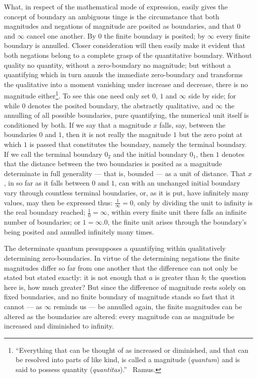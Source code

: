 \documentclass[12pt,a4paper]{book}
\begin{document}
What, in respect of the mathematical mode of expression, easily gives the
concept of boundary an ambiguous tinge is the circumstance that both magnitudes
and negations of magnitude are posited as boundaries, and that $0$ and $\infty$
\setcounter{footnote}{0}
cancel one another. By $0$ the finite boundary is posited; by $\infty$ every
finite boundary is annulled. Closer consideration will then easily make it
evident that both negations belong to a complete grasp of the quantitative
boundary. Without quality no quantity, without a zero-boundary no magnitude;
but without a quantifying which in turn annuls the immediate zero-boundary and
transforms the qualitative into a moment vanishing under increase and decrease,
there is no magnitude either\footnote{``Everything that can be thought of as
increased or diminished, and that can be resolved into parts of like kind, is
called a magnitude (\textit{quantum}) and is said to possess quantity
(\textit{quantitas}).'' \ Ramus.}. To see this one need only set $0$, $1$ and
$\infty$ side by side; for while $0$ denotes the posited boundary, the
abstractly qualitative, and $\infty$ the annulling of all possible boundaries,
pure quantifying, the numerical unit itself is conditioned by both. If we say
that a magnitude $x$ falls, say, between the boundaries $0$ and $1$, then it is
not really the magnitude $1$ but the zero point at which $1$ is passed that
constitutes the boundary, namely the terminal boundary. If we call the terminal
boundary $0_2$ and the initial boundary $0_1$, then $1$ denotes that the
distance between the two boundaries is posited as a magnitude determinate in
full generality --- that is, bounded --- as a unit of distance. That $x$, in so
far as it falls between $0$ and $1$, can with an unchanged initial boundary
vary through countless terminal boundaries, or, as it is put, have infinitely
many values, may then be expressed thus: $\frac{1}{\infty} = 0$, only by
dividing the unit to infinity is the real boundary reached; $\frac{1}{0} =
\infty$, within every finite unit there falls an infinite number of boundaries;
or $1 = \infty. 0$, the finite unit arises through the boundary's being posited
and annulled infinitely many times.

The determinate quantum presupposes a quantifying within qualitatively
determining zero-boundaries. In virtue of the determining negations the finite
magnitudes differ so far from one another that the difference can not only be
stated but stated exactly: it is not enough that $a$ is greater than $b$; the
question here is, how much greater? But since the difference of magnitude rests
solely on fixed boundaries, and no finite boundary of magnitude stands so fast
that it cannot --- as $\infty$ reminds us --- be annulled again, the finite
magnitudes can be altered as the boundaries are altered: every magnitude can as
magnitude be increased and diminished to infinity.
\end{document}
